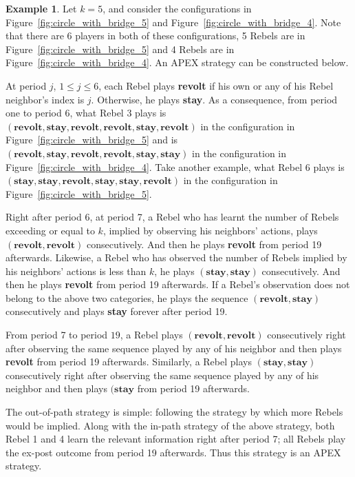 \documentclass[12pt,letter]{article}
\theoremstyle{definition}
\newtheorem{example}{Example}
\theoremstyle{remark}
\theoremstyle{claim}
\begin{document}
\begin{example}
\label{ex:leading}
Let $k=5$, and consider the configurations in Figure~\ref{fig:circle_with_bridge_5} and Figure~\ref{fig:circle_with_bridge_4}. Note that there are 6 players in both of these configurations, 5 Rebels are in Figure~\ref{fig:circle_with_bridge_5} and 4 Rebels are in Figure~\ref{fig:circle_with_bridge_4}. An APEX strategy can be constructed below. 

At period $j$, $1\leq j \leq 6$, each Rebel plays \textbf{revolt} if his own or any of his Rebel neighbor's index is $j$. Otherwise, he plays \textbf{stay}. As a consequence, from period one to period 6, what Rebel 3 plays is $(\textbf{revolt},\textbf{stay},\textbf{revolt}, \textbf{revolt},\textbf{stay}, \textbf{revolt})$ in the configuration in Figure~\ref{fig:circle_with_bridge_5} and is $(\textbf{revolt},\textbf{stay},\textbf{revolt}, \textbf{revolt},\textbf{stay}, \textbf{stay})$ in the configuration in Figure~\ref{fig:circle_with_bridge_4}. Take another example, what Rebel 6 plays is $(\textbf{stay},\textbf{stay},\textbf{revolt}, \textbf{stay},\textbf{stay}, \textbf{revolt})$ in the configuration in Figure~\ref{fig:circle_with_bridge_5}.

Right after period 6, at period 7, a Rebel who has learnt the number of Rebels exceeding or equal to $k$, implied by observing his neighbors' actions, plays $(\textbf{revolt},\textbf{revolt})$ consecutively. And then he plays \textbf{revolt} from period 19 afterwards. Likewise, a Rebel who has observed the number of Rebels implied by his neighbors' actions is less than $k$, he plays $(\textbf{stay},\textbf{stay})$ consecutively. And then he plays \textbf{revolt} from period 19 afterwards. If a Rebel's observation does not belong to the above two categories, he plays the sequence $(\textbf{revolt},\textbf{stay})$ consecutively and plays \textbf{stay} forever after period 19. 

From period 7 to period $19$, a Rebel plays $(\textbf{revolt},\textbf{revolt})$ consecutively right after observing the same sequence played by any of his neighbor and then plays \textbf{revolt} from period 19 afterwards. Similarly, a Rebel plays $(\textbf{stay},\textbf{stay})$ consecutively right after observing the same sequence played by any of his neighbor and then plays $(\textbf{stay}$ from period 19 afterwards. 

The out-of-path strategy is simple: following the strategy by which more Rebels would be implied. Along with the in-path strategy of the above strategy, both Rebel 1 and 4 learn the relevant information right after period 7; all Rebels play the ex-post outcome from period 19 afterwards. Thus this strategy is an APEX strategy.
\end{example}
\end{document}
